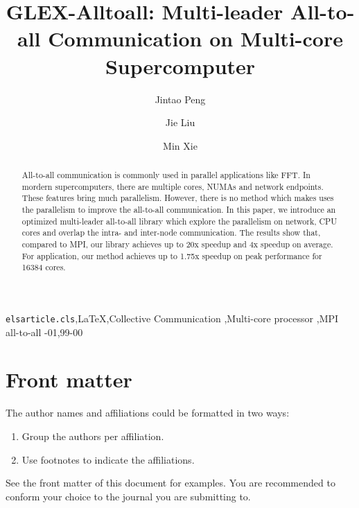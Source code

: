 \documentclass[5p,times]{elsarticle}
\begin{document}
\begin{frontmatter}

\title{GLEX-Alltoall: Multi-leader All-to-all Communication on Multi-core Supercomputer}

\author{Jintao Peng}
\author{Jie Liu}
\author{Min Xie}

\address{Changsha, China}



\begin{abstract}
		All-to-all communication is commonly used in parallel applications like FFT. In mordern supercomputers, there are multiple cores, NUMAs and network endpoints. These features bring much parallelism. However, there is no method which makes uses the parallelism to improve the all-to-all communication. In this paper, we introduce an optimized multi-leader all-to-all library which explore the parallelism on network, CPU cores and overlap the intra- and inter-node communication. The results show that, compared to MPI, our library achieves up to 20x speedup and 4x speedup on average. For application, our method achieves up to 1.75x speedup on peak performance for 16384 cores.
\end{abstract}

\begin{keyword}
\texttt{elsarticle.cls}\sep \LaTeX\sep Collective Communication \sep Multi-core processor \sep MPI all-to-all
-01\sep  99-00
\end{keyword}

\end{frontmatter}

\linenumbers




\section{Front matter}

The author names and affiliations could be formatted in two ways:
\begin{enumerate}[(1)]
\item Group the authors per affiliation.
\item Use footnotes to indicate the affiliations.
\end{enumerate}
See the front matter of this document for examples. You are recommended to conform your choice to the journal you are submitting to.
\end{document}
